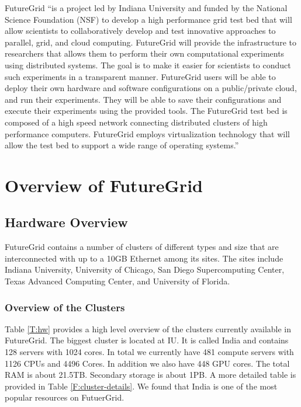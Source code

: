 \documentclass{article}
\newcommand{\FILE}[1]{}
\begin{document}
FutureGrid \cite{las2010gce,las12fg-bookchapter}``is a project led by Indiana University and funded by the National Science Foundation (NSF) to develop a high performance grid test bed that will allow scientists to collaboratively develop and test innovative approaches to parallel, grid, and cloud computing. FutureGrid will provide the infrastructure to researchers that allows them to perform their own computational experiments using distributed systems. The goal is to make it easier for scientists to conduct such experiments in a transparent manner.  FutureGrid users will be able to deploy their own hardware and software configurations on a public/private cloud, and run their experiments. They will be able to save their configurations and execute their experiments using the provided tools. The FutureGrid test bed is composed of a high speed network connecting distributed clusters of high performance computers. FutureGrid employs virtualization technology that will allow the test bed to support a wide range of operating systems.''






\section{Overview of FutureGrid}\label{S:overview}


\FILE{hardware.tex}


\subsection{Hardware Overview}


FutureGrid contains a number of clusters of different types and size that are interconnected with up to a 10GB Ethernet among its sites. The sites include Indiana University, University of Chicago, San Diego Supercomputing Center, Texas Advanced Computing Center, and University of Florida.


\subsubsection{Overview of the Clusters}\label{S:hw-cluster} 


Table \ref{T:hw} provides a high level overview of the clusters currently available in FutureGrid.  The biggest cluster is located at IU. It is called India and contains 128 servers with 1024 cores. In total we currently have 481 compute servers with 1126 CPUs and 4496 Cores. In addition we also have 448 GPU cores. The total RAM is about 21.5TB. Secondary storage is about 1PB. A more detailed table is provided in Table \ref{F:cluster-details}. We found that India is one of the most popular resources on FutuerGrid.
\end{document}
